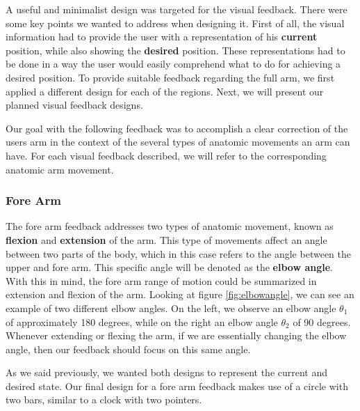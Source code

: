 
A useful and minimalist design was targeted for the visual feedback. There were some key points we wanted to address when designing it.
First of all, the visual information had to provide the user with a representation of his \textbf{current} position, while also showing the \textbf{desired} position. 
These representations had to be done in a way the user would easily comprehend what to do for achieving a desired position.
To provide suitable feedback regarding the full arm, we first applied a different design for each of the regions. Next, we will present our planned visual feedback designs.

Our goal with the following feedback was to accomplish a clear correction of the users arm in the context of the several types of anatomic movements an arm can have. 
For each visual feedback described, we will refer to the corresponding anatomic arm movement.

\subsubsection{Fore Arm}

The fore arm feedback addresses two types of anatomic movement, known as \textbf{flexion} and \textbf{extension} of the arm. 
This type of movements affect an angle between two parts of the body, which in this case refers to the angle between the upper and fore arm. 
This specific angle will be denoted as the \textbf{elbow angle}.
With this in mind, the fore arm range of motion could be summarized in extension and flexion of the arm.
Looking at figure \ref{fig:elbowangle}, we can see an example of two different elbow angles. 
On the left, we observe an elbow angle $\theta$$_1$ of approximately 180 degrees, while on the right an elbow angle $\theta$$_2$ of 90 degrees.  
Whenever extending or flexing the arm, if we are essentially changing the elbow angle, then our feedback should focus on this same angle.

As we said previously, we wanted both designs to represent the current and desired state. 
Our final design for a fore arm feedback makes use of a circle with two bars, similar to a clock with two pointers.

